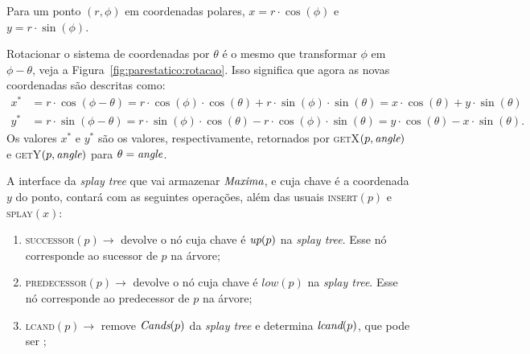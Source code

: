 Para um ponto $(r, \phi)$ em coordenadas polares, $x = r\cdot \cos{(\phi)}$ e $y = r\cdot
\sin{(\phi)}$.

Rotacionar o sistema de coordenadas por $\theta$ é o mesmo que transformar $\phi$ em $\phi -
\theta$, veja a Figura~\ref{fig:parestatico:rotacao}.
Isso significa que agora as novas coordenadas são descritas como:
\begin{align*}
    x^* & = r\cdot \cos{(\phi - \theta)}= r\cdot \cos{(\phi)}\cdot \cos{(\theta)}
    + r\cdot \sin{(\phi)}\cdot \sin{(\theta)} = x\cdot \cos{(\theta)} + y\cdot \sin{(\theta)} \\
    y^* & = r\cdot \sin{(\phi - \theta)} = r\cdot \sin{(\phi)}\cdot \cos{(\theta)}
    - r\cdot \cos{(\phi)}\cdot \sin{(\theta)} = y\cdot \cos{(\theta)} - x\cdot \sin{(\theta)}.
\end{align*}
Os valores $x^*$ e $y^*$ são os valores, respectivamente, retornados por \textsc{getX}$(p,
\textit{angle})$ e \textsc{getY}$(p, \textit{angle})$ para $\theta = \textit{angle}$.



A interface da \textit{splay tree} que vai armazenar $\textit{Maxima}$, e cuja chave é a coordenada $y$ do
ponto, contará com as seguintes operações, além das usuais \textsc{insert}$(p)$ e
\textsc{splay}$(x)$:
\begin{enumerate}
    \item \textsc{successor}$(p) \rightarrow$ devolve o nó
    cuja chave é $\textit{up}(p)$ na \textit{splay tree}.
    Esse nó corresponde ao sucessor de $p$ na árvore;
    \item \textsc{predecessor}$(p) \rightarrow$ devolve o nó cuja chave é $low(p)$ na
    \textit{splay tree}.
    Esse nó corresponde ao predecessor de $p$ na árvore;
    \item \textsc{lcand}$(p) \rightarrow$ remove $\textit{Cands}(p)$ da
    \textit{splay tree} e determina $\textit{lcand}(p)$, que pode ser \nnull;
\end{enumerate}


